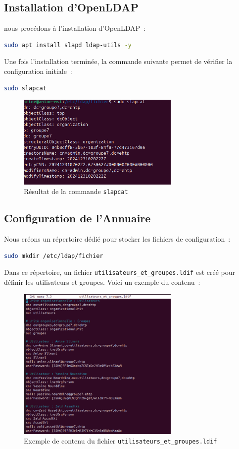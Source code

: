\subsection*{Installation d'OpenLDAP}
nous procédons à l'installation d'OpenLDAP :
\begin{lstlisting}[language=bash]
sudo apt install slapd ldap-utils -y
\end{lstlisting}

Une fois l'installation terminée, la commande suivante permet de vérifier la configuration initiale :
\begin{lstlisting}[language=bash]
sudo slapcat
\end{lstlisting}

\begin{figure}[h]
	\centering
	\includegraphics[width=0.7\textwidth]{LDAP/slapcat1.png}
	\caption{Résultat de la commande \texttt{slapcat}}
	\label{fig:slapcat1}
\end{figure}

\subsection*{Configuration de l'Annuaire}
Nous créons un répertoire dédié pour stocker les fichiers de configuration :
\begin{lstlisting}[language=bash]
sudo mkdir /etc/ldap/fichier
\end{lstlisting}

Dans ce répertoire, un fichier \texttt{utilisateurs\_et\_groupes.ldif} est créé pour définir les utilisateurs et groupes. Voici un exemple du contenu :

\begin{figure}[h]
	\centering
	\includegraphics[width=0.7\textwidth]{LDAP/ut1.png}
	\caption{Exemple de contenu du fichier \texttt{utilisateurs\_et\_groupes.ldif}}
	\label{fig:ut1}
\end{figure}


